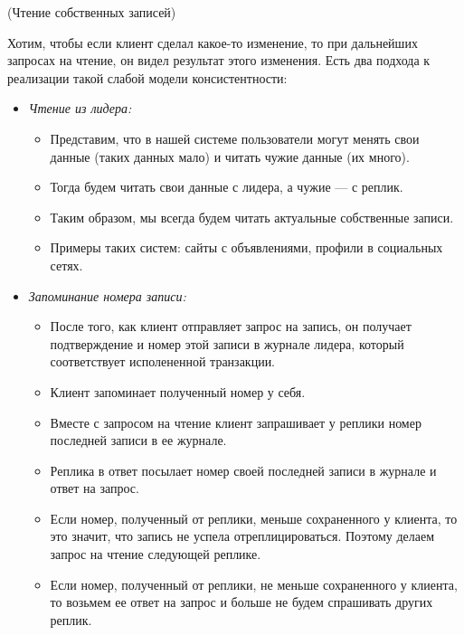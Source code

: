 \begin{example}(Чтение собственных записей)

     Хотим, чтобы если клиент сделал какое-то изменение, то при дальнейших запросах на чтение, он видел результат этого изменения. Есть два подхода к реализации такой слабой модели консистентности:
    \begin{itemize}
        \item \textit{Чтение из лидера:}
        \begin{itemize}
            \item Представим, что в нашей системе пользователи могут менять свои данные (таких данных мало) и читать чужие данные (их много).
            \item Тогда будем читать свои данные с лидера, а чужие --- с реплик.
            \item Таким образом, мы всегда будем читать актуальные собственные записи.
            \item Примеры таких систем: сайты с объявлениями, профили в социальных сетях.
        \end{itemize}

        \item \textit{Запоминание номера записи:}
        \begin{itemize}
            \item После того, как клиент отправляет запрос на запись, он получает подтверждение и номер этой записи в журнале лидера, который соответствует исполененной транзакции.
            \item Клиент запоминает полученный номер у себя.
            \item Вместе с запросом на чтение клиент запрашивает у реплики номер последней записи в ее журнале.
            \item Реплика в ответ посылает номер своей последней записи в журнале и ответ на запрос.
            \item Если номер, полученный от реплики, меньше сохраненного у клиента, то это значит, что запись не успела отреплицироваться. Поэтому делаем запрос на чтение следующей реплике.
            \item Если номер, полученный от реплики, не меньше сохраненного у клиента, то возьмем ее ответ на запрос и больше не будем спрашивать других реплик.
        \end{itemize}

    \end{itemize}

\end{example}
